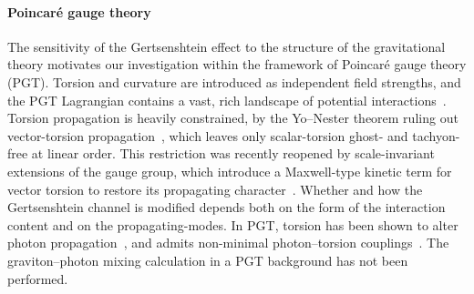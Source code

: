 \paragraph*{Poincar\'e gauge theory}
The sensitivity of the Gertsenshtein effect to the structure of the
gravitational theory motivates our investigation within
the framework of Poincar\'e gauge theory (PGT).
Torsion and curvature are introduced as independent field strengths, and the
PGT Lagrangian contains a vast, rich landscape of
potential interactions~\cite{sezgin1980ghostfree, Sezgin:1981xs, lin2019pgt, blagojevic2018hamiltonian, barker2024poincare}.
Torsion propagation is heavily constrained, \eg by the
Yo--Nester theorem ruling out vector-torsion
propagation~\cite{Yo:2001sy}, which leaves only scalar-torsion
ghost- and tachyon-free at linear order.
This restriction was recently reopened by scale-invariant
extensions of the gauge group, which introduce a Maxwell-type
kinetic term for vector torsion to restore its propagating
character~\cite{barker2024poincare}.
Whether and how the Gertsenshtein channel is modified
depends both on the form of the interaction content
and on the propagating-modes.
In PGT, torsion has been shown to alter
photon propagation~\cite{rubilar2003torsion, obukhov2024electrodynamics, Kruglov:2008cv},
and admits non-minimal photon--torsion couplings~\cite{hehl2000electromagnetic, itin2004maxwell, Gaete:2008vb, Gaete:2009dd, bahamonde2025torsion}.
The graviton--photon mixing calculation in a PGT background
has not been performed.

